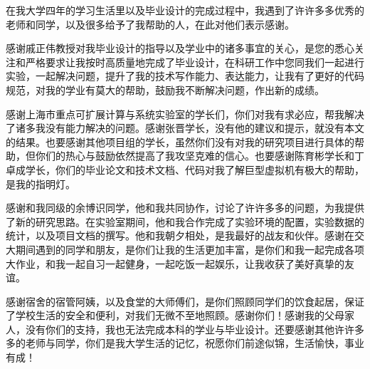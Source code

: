 \begin{thanks}
在我大学四年的学习生活里以及毕业设计的完成过程中，我遇到了许许多多优秀的老师和同学，以及很多给予了我帮助的人，在此对他们表示感谢。

感谢戚正伟教授对我毕业设计的指导以及学业中的诸多事宜的关心，是您的悉心关注和严格要求让我按时高质量地完成了毕业设计，在科研工作中您同我们一起进行实验，一起解决问题，提升了我的技术写作能力、表达能力，让我有了更好的代码规范，对我的学业有莫大的帮助，鼓励我不断解决问题，作出新的成绩。

感谢上海市重点可扩展计算与系统实验室的学长们，你们对我有求必应，帮我解决了诸多我没有能力解决的问题。感谢张晋学长，没有他的建议和提示，就没有本文的结果。也要感谢其他项目组的学长，虽然你们没有对我的研究项目进行具体的帮助，但你们的热心与鼓励依然提高了我攻坚克难的信心。也要感谢陈育彬学长和丁卓成学长，你们的毕业论文和技术文档、代码对我了解巨型虚拟机有极大的帮助，是我的指明灯。

感谢和我同级的余博识同学，他和我共同协作，讨论了许许多多的问题，为我提供了新的研究思路。在实验室期间，他和我合作完成了实验环境的配置，实验数据的统计，以及项目文档的撰写。他和我朝夕相处，是我最好的战友和伙伴。感谢在交大期间遇到的同学和朋友，是你们让我的生活更加丰富，是你们和我一起完成各项大作业，和我一起自习一起健身，一起吃饭一起娱乐，让我收获了美好真挚的友谊。

感谢宿舍的宿管阿姨，以及食堂的大师傅们，是你们照顾同学们的饮食起居，保证了学校生活的安全和便利，对我们无微不至地照顾。感谢你们！感谢我的父母家人，没有你们的支持，我也无法完成本科的学业与毕业设计。还要感谢其他许许多多的老师与同学，你们是我大学生活的记忆，祝愿你们前途似锦，生活愉快，事业有成！

  

\end{thanks}
